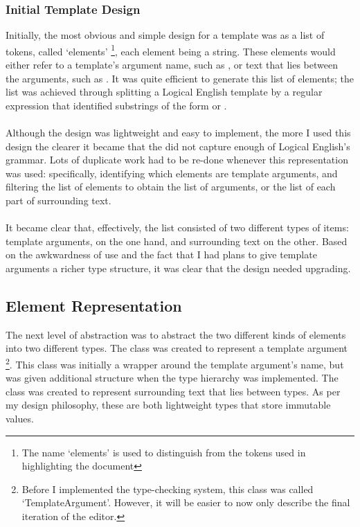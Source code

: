 \documentclass[../main.tex]{subfiles}
\begin{document}
\subsubsection{Initial Template Design}
Initially, the most obvious and simple design for a template was as a list of tokens, called `elements' \footnote{The name `elements' is used to distinguish from the tokens used in highlighting the document}, each element being a string. These elements would either refer to a template's argument name, such as , or text that lies between the arguments, such as . It was quite efficient to generate this list of elements; the list was achieved through splitting a Logical English template by a regular expression that identified substrings of the form  or . 
\\
\\
Although the design was lightweight and easy to implement, the more I used this design the clearer it became that the did not capture enough of Logical English's grammar. Lots of duplicate work had to be re-done whenever this representation was used: specifically, identifying which elements are template arguments, and filtering the list of elements to obtain the list of arguments, or the list of each part of surrounding text. 
\\ 
\\
It became clear that, effectively, the list consisted of two different types of items: template arguments, on the one hand, and surrounding text on the other. Based on the awkwardness of use and the fact that I had plans to give template arguments a richer type structure, it was clear that the design needed upgrading.

\subsection{Element Representation}
The next level of abstraction was to abstract the two different kinds of elements into two different types.
The class  was created to represent a template argument \footnote{Before I implemented the type-checking system, this class was called `TemplateArgument'. However, it will be easier to now only describe the final iteration of the editor.}. This  class was initially a wrapper around the template argument's name, but was given additional structure when the type hierarchy was implemented. The class  was created to represent surrounding text that lies between types. As per my design philosophy, these are both lightweight types that store immutable values.
\end{document}

